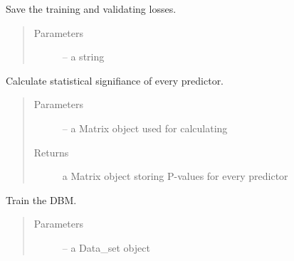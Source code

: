 \documentclass[letterpaper,10pt,english]{sphinxmanual}
\begin{document}
\begin{fulllineitems}
\begin{fulllineitems}
\label{\detokenize{index:dbm_py.interface.AUTO_DBM.save_performance}}
Save the training and validating losses.
\begin{quote}\begin{description}
\item[{Parameters}] \leavevmode
{} -- a string

\end{description}\end{quote}

\end{fulllineitems}


\begin{fulllineitems}
\label{\detokenize{index:dbm_py.interface.AUTO_DBM.ss}}
Calculate statistical signifiance of every predictor.
\begin{quote}\begin{description}
\item[{Parameters}] \leavevmode
{} -- a Matrix object used for calculating

\item[{Returns}] \leavevmode
a Matrix object storing P-values for every predictor

\end{description}\end{quote}

\end{fulllineitems}


\begin{fulllineitems}
\label{\detokenize{index:dbm_py.interface.AUTO_DBM.train}}
Train the DBM.
\begin{quote}\begin{description}
\item[{Parameters}] \leavevmode
{} -- a Data\_set object

\end{description}\end{quote}

\end{fulllineitems}


\end{fulllineitems}
\end{document}
